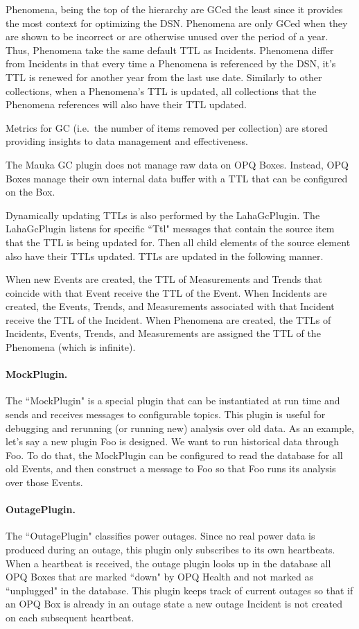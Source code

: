 Phenomena, being the top of the hierarchy are GCed the least since it provides the most context for optimizing the DSN. Phenomena are only GCed when they are shown to be incorrect or are otherwise unused over the period of a year. Thus, Phenomena take the same default TTL as Incidents. Phenomena differ from Incidents in that every time a Phenomena is referenced by the DSN, it's TTL is renewed for another year from the last use date. Similarly to other collections, when a Phenomena's TTL is updated, all collections that the Phenomena references will also have their TTL updated.

Metrics for GC (i.e.\ the number of items removed per collection) are stored providing insights to data management and effectiveness.

The Mauka GC plugin does not manage raw data on OPQ Boxes. Instead, OPQ Boxes manage their own internal data buffer with a TTL that can be configured on the Box.

Dynamically updating TTLs is also performed by the LahaGcPlugin. The LahaGcPlugin listens for specific ``Ttl" messages that contain the source item that the TTL is being updated for. Then all child elements of the source element also have their TTLs updated. TTLs are updated in the following manner.

When new Events are created, the TTL of Measurements and Trends that coincide with that Event receive the TTL of the Event. When Incidents are created, the Events, Trends, and Measurements associated with that Incident receive the TTL of the Incident. When Phenomena are created, the TTLs of Incidents, Events, Trends, and Measurements are assigned the TTL of the Phenomena (which is infinite).

\paragraph{MockPlugin.}
The ``MockPlugin" is a special plugin that can be instantiated at run time and sends and receives messages to configurable topics. This plugin is useful for debugging and rerunning (or running new) analysis over old data. As an example, let's say a new plugin Foo is designed. We want to run historical data through Foo. To do that, the MockPlugin can be configured to read the database for all old Events, and then construct a message to Foo so that Foo runs its analysis over those Events.

\paragraph{OutagePlugin.}
The ``OutagePlugin" classifies power outages. Since no real power data is produced during an outage, this plugin only subscribes to its own heartbeats. When a heartbeat is received, the outage plugin looks up in the database all OPQ Boxes that are marked ``down" by OPQ Health and not marked as ``unplugged" in the database. This plugin keeps track of current outages so that if an OPQ Box is already in an outage state a new outage Incident is not created on each subsequent heartbeat.

